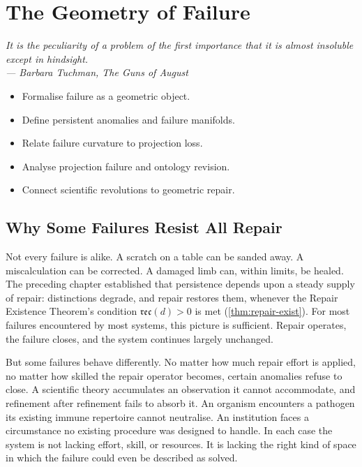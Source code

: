 \documentclass[12pt,twoside,openright]{book}
\newcommand{\reco}{\mathfrak{rec}}
\newenvironment{epigraph}[2]{%
  \vspace{1em}\begin{flushright}
  \begin{minipage}{0.72\textwidth}
  \itshape\small #1\\[0.4em]
  \upshape\footnotesize\sffamily\color{DistGray}--- #2
  \end{minipage}\end{flushright}\vspace{1.5em}}{}
\newenvironment{objectives}{%
  \begin{tcolorbox}[colback=DistBlue!5,colframe=DistBlue,
    title={\faCheckCircle\enspace Learning Objectives},
    fonttitle=\sffamily\bfseries\color{white},
    attach boxed title to top left={yshift=-2mm,xshift=4mm},
    boxed title style={colback=DistBlue},breakable]
  \begin{itemize}[leftmargin=*,nosep]}{%
  \end{itemize}\end{tcolorbox}\vspace{1em}}
\begin{document}
\chapter{The Geometry of Failure}
\label{ch:geometry-failure}
\begin{epigraph}{It is the peculiarity of a problem of the
  first importance that it is almost insoluble except in
  hindsight.}%
  {Barbara Tuchman, \textit{The Guns of August}}
\end{epigraph}

\begin{objectives}
  \item Formalise failure as a geometric object.
  \item Define persistent anomalies and failure manifolds.
  \item Relate failure curvature to projection loss.
  \item Analyse projection failure and ontology revision.
  \item Connect scientific revolutions to geometric repair.
\end{objectives}

\section{Why Some Failures Resist All Repair}
\label{sec:ch8-why-failures-resist}

Not every failure is alike. A scratch on a table can be
sanded away. A miscalculation can be corrected. A damaged
limb can, within limits, be healed. The preceding chapter
established that persistence depends upon a steady supply
of repair: distinctions degrade, and repair restores them,
whenever the Repair Existence Theorem's condition
$\reco(d)>0$ is met (\cref{thm:repair-exist}). For most
failures encountered by most systems, this picture is
sufficient. Repair operates, the failure closes, and the
system continues largely unchanged.

But some failures behave differently. No matter how much
repair effort is applied, no matter how skilled the repair
operator becomes, certain anomalies refuse to close. A
scientific theory accumulates an observation it cannot
accommodate, and refinement after refinement fails to
absorb it. An organism encounters a pathogen its existing
immune repertoire cannot neutralise. An institution faces a
circumstance no existing procedure was designed to handle.
In each case the system is not lacking effort, skill, or
resources. It is lacking the right kind of space in which
the failure could even be described as solved.
\end{document}
